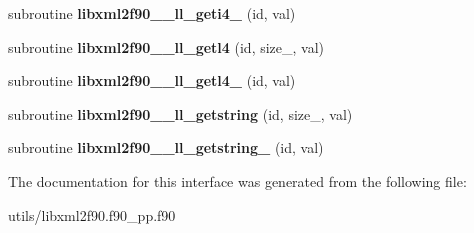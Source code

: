 \begin{DoxyCompactItemize}
\item 
\hypertarget{interfacelibxml2f90__interface__module_1_1libxml2f90____getid_a4e3e55b3dc72d0b237e9c6800f3fc146}{
subroutine {\bfseries libxml2f90\_\-\_\-ll\_\-geti4\_\-} (id, val)}
\label{interfacelibxml2f90__interface__module_1_1libxml2f90____getid_a4e3e55b3dc72d0b237e9c6800f3fc146}

\item 
\hypertarget{interfacelibxml2f90__interface__module_1_1libxml2f90____getid_ac8ee9f5b40986b39fdcbdd3704d38f36}{
subroutine {\bfseries libxml2f90\_\-\_\-ll\_\-getl4} (id, size\_\-, val)}
\label{interfacelibxml2f90__interface__module_1_1libxml2f90____getid_ac8ee9f5b40986b39fdcbdd3704d38f36}

\item 
\hypertarget{interfacelibxml2f90__interface__module_1_1libxml2f90____getid_a3ff3898453a4c3d066cde17b28c3782e}{
subroutine {\bfseries libxml2f90\_\-\_\-ll\_\-getl4\_\-} (id, val)}
\label{interfacelibxml2f90__interface__module_1_1libxml2f90____getid_a3ff3898453a4c3d066cde17b28c3782e}

\item 
\hypertarget{interfacelibxml2f90__interface__module_1_1libxml2f90____getid_adb9b74ac9863918c373410e0def71d25}{
subroutine {\bfseries libxml2f90\_\-\_\-ll\_\-getstring} (id, size\_\-, val)}
\label{interfacelibxml2f90__interface__module_1_1libxml2f90____getid_adb9b74ac9863918c373410e0def71d25}

\item 
\hypertarget{interfacelibxml2f90__interface__module_1_1libxml2f90____getid_ab52962d986e6297e30e2df5d6bce0817}{
subroutine {\bfseries libxml2f90\_\-\_\-ll\_\-getstring\_\-} (id, val)}
\label{interfacelibxml2f90__interface__module_1_1libxml2f90____getid_ab52962d986e6297e30e2df5d6bce0817}

\end{DoxyCompactItemize}


The documentation for this interface was generated from the following file:\begin{DoxyCompactItemize}
\item 
utils/libxml2f90.f90\_\-pp.f90\end{DoxyCompactItemize}
